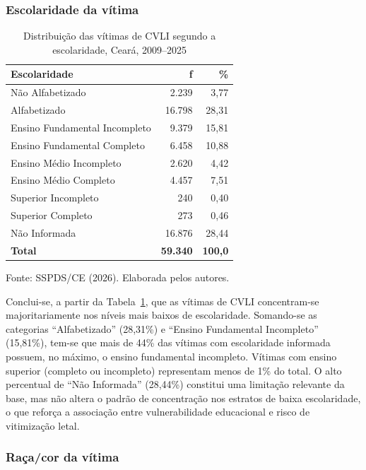 \documentclass[12pt,a4paper]{article}
\newcommand{\fonte}[1]{  \vspace{-2mm}
  \begin{center}\footnotesize Fonte: #1\end{center}
}
\begin{document}
\subsubsection{Escolaridade da vítima}

\begin{table}[H]
\centering
\caption{Distribuição das vítimas de CVLI segundo a escolaridade, Ceará, 2009--2025}
\label{tab:escolaridade}
\begin{tabular}{lrr}
\toprule
\textbf{Escolaridade} & \textbf{f} & \textbf{\%} \\
\midrule
Não Alfabetizado                 & 2.239  & 3,77  \\
Alfabetizado                     & 16.798 & 28,31 \\
Ensino Fundamental Incompleto    & 9.379  & 15,81 \\
Ensino Fundamental Completo      & 6.458  & 10,88 \\
Ensino Médio Incompleto          & 2.620  & 4,42  \\
Ensino Médio Completo            & 4.457  & 7,51  \\
Superior Incompleto              & 240    & 0,40  \\
Superior Completo                & 273    & 0,46  \\
Não Informada                    & 16.876 & 28,44 \\
\midrule
\textbf{Total}               & \textbf{59.340} & \textbf{100,0} \\
\bottomrule
\end{tabular}
\end{table}
\fonte{SSPDS/CE (2026). Elaborada pelos autores.}

Conclui-se, a partir da Tabela~\ref{tab:escolaridade}, que as vítimas de CVLI concentram-se majoritariamente nos níveis mais baixos de escolaridade. Somando-se as categorias ``Alfabetizado'' (28,31\%) e ``Ensino Fundamental Incompleto'' (15,81\%), tem-se que mais de 44\% das vítimas com escolaridade informada possuem, no máximo, o ensino fundamental incompleto. Vítimas com ensino superior (completo ou incompleto) representam menos de 1\% do total. O alto percentual de ``Não Informada'' (28,44\%) constitui uma limitação relevante da base, mas não altera o padrão de concentração nos estratos de baixa escolaridade, o que reforça a associação entre vulnerabilidade educacional e risco de vitimização letal.

\subsubsection{Raça/cor da vítima}
\end{document}
